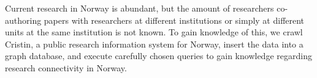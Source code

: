 Current research in Norway is abundant, but the amount of researchers co-authoring papers with researchers at different institutions or simply at different units at the same institution is not known.
To gain knowledge of this, we crawl Cristin, a public research information system for Norway, insert the data into a graph database, and execute carefully chosen queries to gain knowledge regarding research connectivity in Norway.
